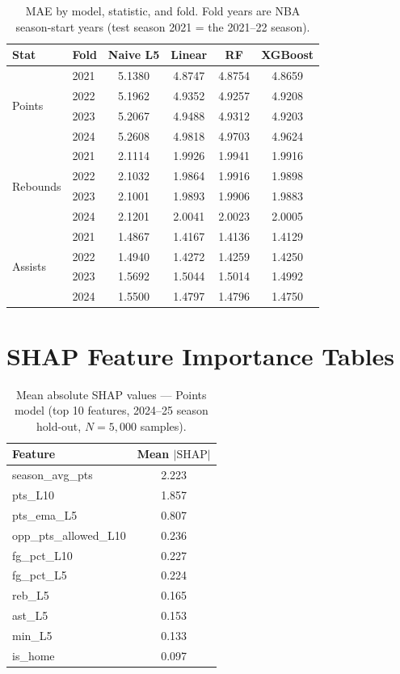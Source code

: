 \documentclass[12pt, letterpaper]{article}
\begin{document}
\begin{table}[H]
\centering
\caption{MAE by model, statistic, and fold. Fold years are NBA
         season-start years (test season 2021 = the 2021--22 season).}
\label{tab:fold_detail}
\begin{tabular}{llcccc}
\toprule
\textbf{Stat} & \textbf{Fold} & \textbf{Naive L5} & \textbf{Linear} & \textbf{RF} & \textbf{XGBoost} \\
\midrule
\multirow{4}{*}{Points}
  & 2021 & 5.1380 & 4.8747 & 4.8754 & 4.8659 \\
  & 2022 & 5.1962 & 4.9352 & 4.9257 & 4.9208 \\
  & 2023 & 5.2067 & 4.9488 & 4.9312 & 4.9203 \\
  & 2024 & 5.2608 & 4.9818 & 4.9703 & 4.9624 \\
\midrule
\multirow{4}{*}{Rebounds}
  & 2021 & 2.1114 & 1.9926 & 1.9941 & 1.9916 \\
  & 2022 & 2.1032 & 1.9864 & 1.9916 & 1.9898 \\
  & 2023 & 2.1001 & 1.9893 & 1.9906 & 1.9883 \\
  & 2024 & 2.1201 & 2.0041 & 2.0023 & 2.0005 \\
\midrule
\multirow{4}{*}{Assists}
  & 2021 & 1.4867 & 1.4167 & 1.4136 & 1.4129 \\
  & 2022 & 1.4940 & 1.4272 & 1.4259 & 1.4250 \\
  & 2023 & 1.5692 & 1.5044 & 1.5014 & 1.4992 \\
  & 2024 & 1.5500 & 1.4797 & 1.4796 & 1.4750 \\
\bottomrule
\end{tabular}
\end{table}

\section{SHAP Feature Importance Tables}
\label{app:shap}

\begin{table}[H]
\centering
\caption{Mean absolute SHAP values --- Points model (top 10 features,
         2024--25 season hold-out, $N=5{,}000$ samples).}
\label{tab:shap_pts}
\begin{tabular}{lc}
\toprule
\textbf{Feature} & \textbf{Mean $|\text{SHAP}|$} \\
\midrule
season\_avg\_pts      & 2.223 \\
pts\_L10              & 1.857 \\
pts\_ema\_L5          & 0.807 \\
opp\_pts\_allowed\_L10 & 0.236 \\
fg\_pct\_L10          & 0.227 \\
fg\_pct\_L5           & 0.224 \\
reb\_L5               & 0.165 \\
ast\_L5               & 0.153 \\
min\_L5               & 0.133 \\
is\_home              & 0.097 \\
\bottomrule
\end{tabular}
\end{table}
\end{document}
